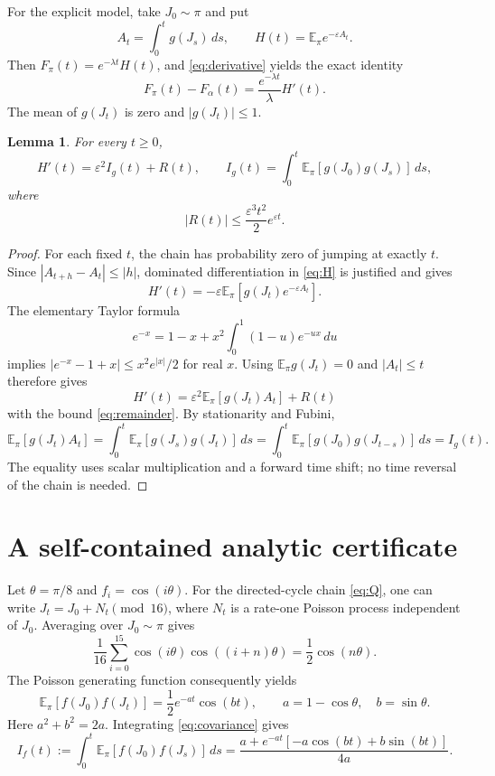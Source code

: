 \documentclass[11pt]{article}
\newtheorem{lemma}{Lemma}
\newcommand{\EE}{\mathbb E}
\begin{document}
For the explicit model, take $J_0\sim\pi$ and put
\begin{equation}\label{eq:H}
 A_t=\int_0^t g(J_s)\,ds,\qquad
 H(t)=\EE_\pi e^{-\varepsilon A_t}.
\end{equation}
Then $F_\pi(t)=e^{-\lambda t}H(t)$, and
\eqref{eq:derivative} yields the exact identity
\begin{equation}\label{eq:difference}
 F_\pi(t)-F_\alpha(t)=\frac{e^{-\lambda t}}{\lambda}H'(t).
\end{equation}
The mean of $g(J_t)$ is zero and $|g(J_t)|\leq1$.

\begin{lemma}\label{lem:expansion}
For every $t\geq0$,
\begin{equation}\label{eq:expansion}
 H'(t)=\varepsilon^2 I_g(t)+R(t),\qquad
 I_g(t)=\int_0^t\EE_\pi[g(J_0)g(J_s)]\,ds,
\end{equation}
where
\begin{equation}\label{eq:remainder}
 |R(t)|\leq\frac{\varepsilon^3t^2}{2}e^{\varepsilon t}.
\end{equation}
\end{lemma}
\begin{proof}
For each fixed $t$, the chain has probability zero of jumping at
exactly $t$. Since $|A_{t+h}-A_t|\leq|h|$, dominated differentiation
in \eqref{eq:H} is justified and gives
\[
 H'(t)=-\varepsilon\EE_\pi[g(J_t)e^{-\varepsilon A_t}].
\]
The elementary Taylor formula
\[
 e^{-x}=1-x+x^2\int_0^1(1-u)e^{-ux}\,du
\]
implies $|e^{-x}-1+x|\leq x^2e^{|x|}/2$ for real $x$.
Using $\EE_\pi g(J_t)=0$ and $|A_t|\leq t$ therefore gives
\[
 H'(t)=\varepsilon^2\EE_\pi[g(J_t)A_t]+R(t)
\]
with the bound \eqref{eq:remainder}. By stationarity and Fubini,
\[
 \EE_\pi[g(J_t)A_t]
 =\int_0^t\EE_\pi[g(J_s)g(J_t)]\,ds
 =\int_0^t\EE_\pi[g(J_0)g(J_{t-s})]\,ds=I_g(t).
\]
The equality uses scalar multiplication and a forward time shift;
no time reversal of the chain is needed.
\end{proof}

\section{A self-contained analytic certificate}
Let $\theta=\pi/8$ and $f_i=\cos(i\theta)$. For the directed-cycle
chain \eqref{eq:Q}, one can write
$J_t=J_0+N_t\pmod{16}$, where $N_t$ is a rate-one Poisson process
independent of $J_0$. Averaging over $J_0\sim\pi$ gives
\[
 \frac1{16}\sum_{i=0}^{15}\cos(i\theta)\cos((i+n)\theta)
 =\frac12\cos(n\theta).
\]
The Poisson generating function consequently yields
\begin{equation}\label{eq:covariance}
 \EE_\pi[f(J_0)f(J_t)]
 =\frac12 e^{-at}\cos(bt),\qquad
 a=1-\cos\theta,\quad b=\sin\theta.
\end{equation}
Here $a^2+b^2=2a$. Integrating \eqref{eq:covariance} gives
\begin{equation}\label{eq:integral}
 I_f(t):=\int_0^t\EE_\pi[f(J_0)f(J_s)]\,ds
 =\frac{a+e^{-at}[-a\cos(bt)+b\sin(bt)]}{4a}.
\end{equation}
\end{document}
